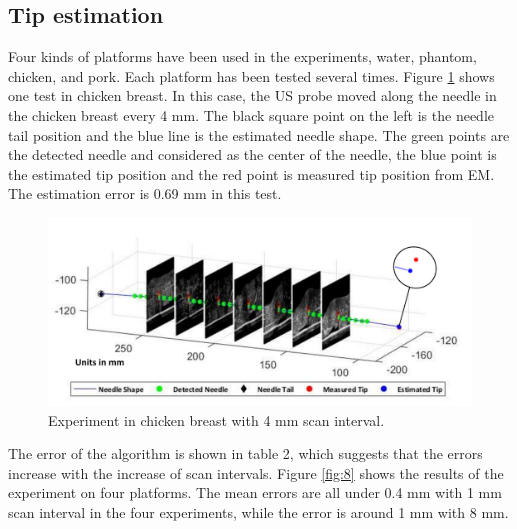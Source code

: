 \documentclass[journal,article,submit,moreauthors,pdftex]{Definitions/mdpi}
\begin{document}
\subsection{Tip estimation}
Four kinds of platforms have been used in the experiments, water, phantom, chicken, and pork. Each platform has been tested several times. Figure \ref{fig:7} shows one test in chicken breast. In this case, the US probe moved along the needle in the chicken breast every 4 mm. The black square point on the left is the needle tail position and the blue line is the estimated needle shape. The green points are the detected needle and considered as the center of the needle, the blue point is the estimated tip position and the red point is measured tip position from EM. The estimation error is 0.69 mm in this test.
\begin{figure}[H]
\centering
\includegraphics[width=\textwidth]{figures/2/f7.pdf}
\captionsetup{width=14 cm,justification=centering}
\caption{Experiment in chicken breast with 4 mm scan interval.}\label{fig:7}
\end{figure}

The error of the algorithm is shown in table 2, which suggests that the errors increase with the increase of scan intervals. Figure \ref{fig:8} shows the results of the experiment on four platforms. The mean errors are all under 0.4 mm with 1 mm scan interval in the four experiments, while the error is around 1 mm with 8 mm.
\end{document}
